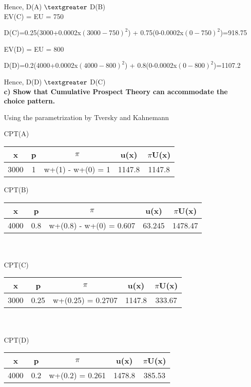 \documentclass{article}
\begin{document}
  Hence, D(A) $\textgreater$ D(B)\\

EV(C) = EU = 750

D(C)=0.25(3000+0.0002x$(3000-750)^2$) + 0.75(0-0.0002x$(0-750)^2$)=918.75

EV(D) = EU = 800

D(D)=0.2(4000+0.0002x$(4000-800)^2$) + 0.8(0-0.0002x$(0-800)^2$)=1107.2

  Hence, D(D) $\textgreater$ D(C)\\
  
\textbf{ c) Show that Cumulative Prospect Theory can accommodate the choice pattern. }   

\vspace{2mm}

Using the parametrization by Tversky and Kahnemann

\vspace{3mm}

CPT(A)

	\begin{tabular}{|c|c|c|c|c|}
	\hline
		x    & p & $\pi$         & u(x)        & $\pi$U(x)  \\  \hline
			3000 & 1 & w+(1) - w+(0) = 1 &1147.8 & 1147.8 \\
	\hline
	\end{tabular} 
\vspace{7mm}

CPT(B)

	\begin{tabular}{|c|c|c|c|c|}
		\hline
		x    & p & $\pi$             & u(x) & $\pi$U(x) \\  \hline
		4000 & 0.8 & w+(0.8) - w+(0) = 0.607 & 63.245  &  1478.47 \\
		\hline
	\end{tabular} \\ \\

CPT(C)

\begin{tabular}{|c|c|c|c|c|}
	\hline
	x    & p & $\pi$             & u(x) & $\pi$U(x) \\  \hline
	3000 & 0.25 & w+(0.25) = 0.2707 & 1147.8  &  333.67 \\
	\hline
\end{tabular} \\ \\

CPT(D)

\begin{tabular}{|c|c|c|c|c|}
	\hline
	x    & p & $\pi$             & u(x) & $\pi$U(x) \\  \hline
	4000 & 0.2 & w+(0.2) = 0.261 & 1478.8  &  385.53 \\
	\hline
\end{tabular} \\
\end{document}
